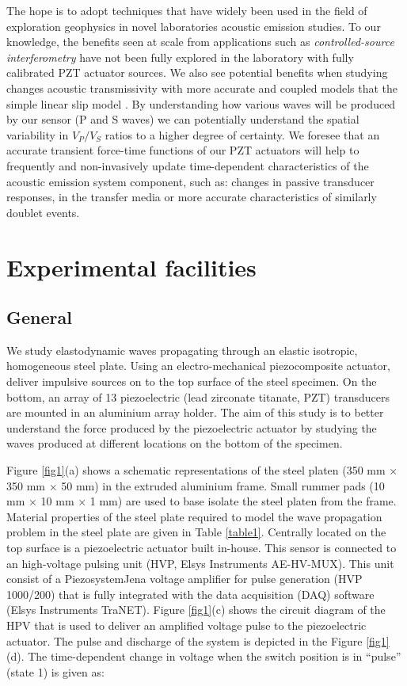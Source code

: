 \documentclass[preprint,3p, 11pt,authoryear]{elsarticle}
\begin{document}
The hope is to adopt techniques that have widely been used in the field of exploration geophysics in novel laboratories acoustic emission studies. To our knowledge, the benefits seen at scale from applications such as \textit{controlled-source interferometry} have not been fully explored in the laboratory with fully calibrated PZT actuator sources. We also see potential benefits when studying changes acoustic transmissivity \citep{PyrakNolte1980} with more accurate and coupled models that the simple linear slip model \citep[LSM,][]{Kendall1957}.  By understanding how various waves will be produced by our sensor (P and S waves) we can potentially understand the spatial variability in $V_{P}/V_{S}$ ratios to a higher degree of certainty. We foresee that an accurate transient force-time functions of our PZT actuators will help to frequently and non-invasively update time-dependent characteristics of the acoustic emission system component, such as: changes in passive transducer responses, in the transfer media or more accurate characteristics of similarly doublet events.  



\section{Experimental facilities}
\subsection{General}

We study elastodynamic waves propagating through an elastic isotropic, homogeneous steel plate. Using an electro-mechanical piezocomposite actuator, deliver impulsive sources on to the top surface of the steel specimen. On the bottom, an array of 13 piezoelectric (lead zirconate titanate, PZT) transducers are mounted in an aluminium array holder. The aim of this study is to better understand the force produced by the piezoelectric actuator by studying the waves produced at different locations on the bottom of the specimen.

Figure \ref{fig1}(a) shows a schematic representations of the steel platen (350 mm $\times$ 350 mm $\times$ 50 mm) in the extruded aluminium frame. Small rummer pads (10 mm $\times$ 10 mm $\times$ 1 mm) are used to base isolate the steel platen from the frame. Material properties of the steel plate required to model the wave propagation problem in the steel plate are given in Table \ref{table1}. Centrally located on the top surface is a piezoelectric actuator built in-house.  This sensor is connected to an high-voltage pulsing unit (HVP, Elsys Instruments AE-HV-MUX). This unit consist of a PiezosystemJena voltage amplifier for pulse generation (HVP 1000/200) that is fully integrated with the data acquisition (DAQ) software (Elsys Instruments TraNET). Figure \ref{fig1}(c) shows the circuit diagram of the HPV that is used to deliver an amplified voltage pulse to the piezoelectric actuator. The pulse and discharge of the system is depicted in the Figure \ref{fig1}(d). The time-dependent change in voltage when the switch position is in ``pulse'' (state 1) is given as:
\end{document}
